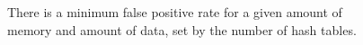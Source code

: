 \documentclass[12pt]{article} \usepackage{simplemargins}
\begin{document}
\begin{figure}
\caption{There is a minimum false positive rate for a given amount of memory
and amount of data, set by the number of hash tables.}
\end{figure}
\end{document}
